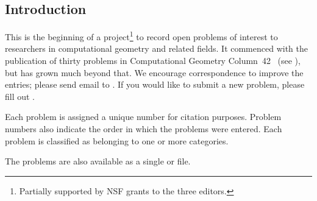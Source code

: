 \subsection{Introduction}
This is the beginning of a project\footnote{
Partially supported by NSF grants to the three editors.} 
to record open problems
of interest to researchers in computational geometry and
related fields.  It commenced with the publication of
thirty problems in Computational Geometry Column~42~\cite{mo-cgc42-01}
(see ),
but has grown much beyond that.
We encourage correspondence to improve the entries; please send email to
.
If you would like to submit a new problem, please fill out
.

Each problem is assigned a unique number for citation purposes.
Problem numbers also indicate the order in which the problems were entered.
Each problem is classified as belonging to one or more categories.

The problems are also available as a single
or 
file.

